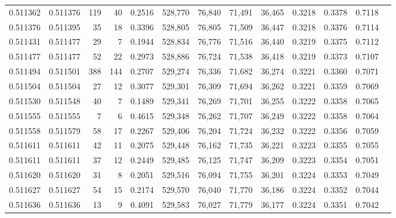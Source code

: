 \begin{tabular}{rrrrrrrrrrrrr}
0.511362 & 0.511376 &   119 &    40 &                                     0.2516 & 528,770 &  76,840 &  71,491 &  36,465 & 0.3218 & 0.3378 & 0.7118 \\
0.511376 & 0.511395 &    35 &    18 &                                     0.3396 & 528,805 &  76,805 &  71,509 &  36,447 & 0.3218 & 0.3376 & 0.7114 \\
0.511431 & 0.511477 &    29 &     7 &                                     0.1944 & 528,834 &  76,776 &  71,516 &  36,440 & 0.3219 & 0.3375 & 0.7112 \\
0.511477 & 0.511477 &    52 &    22 &                                     0.2973 & 528,886 &  76,724 &  71,538 &  36,418 & 0.3219 & 0.3373 & 0.7107 \\
0.511494 & 0.511501 &   388 &   144 &                                     0.2707 & 529,274 &  76,336 &  71,682 &  36,274 & 0.3221 & 0.3360 & 0.7071 \\
0.511504 & 0.511504 &    27 &    12 &                                     0.3077 & 529,301 &  76,309 &  71,694 &  36,262 & 0.3221 & 0.3359 & 0.7069 \\
0.511530 & 0.511548 &    40 &     7 &                                     0.1489 & 529,341 &  76,269 &  71,701 &  36,255 & 0.3222 & 0.3358 & 0.7065 \\
0.511555 & 0.511555 &     7 &     6 &                                     0.4615 & 529,348 &  76,262 &  71,707 &  36,249 & 0.3222 & 0.3358 & 0.7064 \\
0.511558 & 0.511579 &    58 &    17 &                                     0.2267 & 529,406 &  76,204 &  71,724 &  36,232 & 0.3222 & 0.3356 & 0.7059 \\
0.511611 & 0.511611 &    42 &    11 &                                     0.2075 & 529,448 &  76,162 &  71,735 &  36,221 & 0.3223 & 0.3355 & 0.7055 \\
0.511611 & 0.511611 &    37 &    12 &                                     0.2449 & 529,485 &  76,125 &  71,747 &  36,209 & 0.3223 & 0.3354 & 0.7051 \\
0.511620 & 0.511620 &    31 &     8 &                                     0.2051 & 529,516 &  76,094 &  71,755 &  36,201 & 0.3224 & 0.3353 & 0.7049 \\
0.511627 & 0.511627 &    54 &    15 &                                     0.2174 & 529,570 &  76,040 &  71,770 &  36,186 & 0.3224 & 0.3352 & 0.7044 \\
0.511636 & 0.511636 &    13 &     9 &                                     0.4091 & 529,583 &  76,027 &  71,779 &  36,177 & 0.3224 & 0.3351 & 0.7042 \\

\end{tabular}
